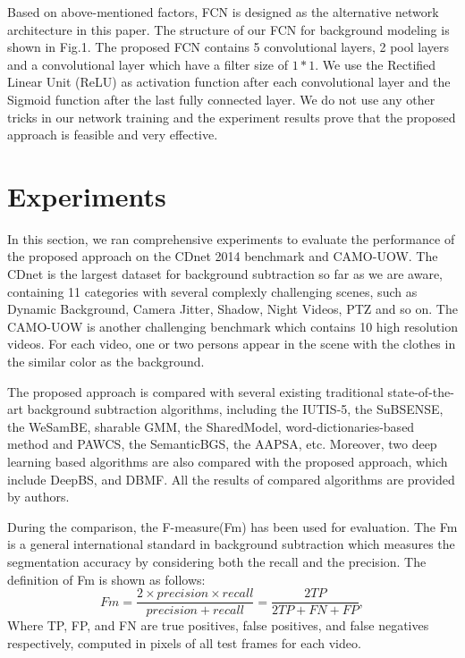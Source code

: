 \documentclass[journal]{IEEEtran}
\begin{document}
Based on above-mentioned factors, FCN is designed as the alternative network architecture in this paper. 
The structure of our FCN for background modeling is shown in Fig.1. 
The proposed FCN contains 5 convolutional layers, 2 pool layers and a convolutional layer which have a filter size of $1*1$. 
We use the Rectified Linear Unit (ReLU) as activation function after each convolutional layer and the Sigmoid function after the last fully connected layer. 
We do not use any other tricks in our network training and the experiment results prove that the proposed approach is feasible and very effective.


\section{Experiments}

In this section, we ran comprehensive experiments to evaluate the performance of the proposed approach on the CDnet 2014 benchmark and CAMO-UOW. 
The CDnet is the largest dataset for background subtraction so far as we are aware, containing 11 categories with several complexly challenging scenes, such as Dynamic Background, Camera Jitter, Shadow, Night Videos, PTZ and so on. 
The CAMO-UOW is another challenging benchmark which contains 10 high resolution videos. 
For each video, one or two persons appear in the scene with the clothes in the similar color as the background.

The proposed approach is compared with several existing traditional state-of-the-art background subtraction algorithms, including the IUTIS-5, the SuBSENSE, the WeSamBE, sharable GMM, the SharedModel, word-dictionaries-based method and PAWCS, the SemanticBGS, the AAPSA, etc. 
Moreover, two deep learning based algorithms are also compared with the proposed approach, which include DeepBS, and DBMF. 
All the results of compared algorithms are provided by authors.

During the comparison, the F-measure(Fm) has been used for evaluation. 
The Fm is a general international standard in background subtraction which measures the segmentation accuracy by considering both the recall and the precision. 
The definition of Fm is shown as follows:
\begin{equation}
Fm= \frac{2\times precision \times recall}{precision + recall} = \frac{2TP}{2TP+FN+FP},
\end{equation}
% 
% 
%
Where TP, FP, and FN are true positives, false positives, and false negatives respectively, computed in pixels of all test frames for each video. 
\end{document}
